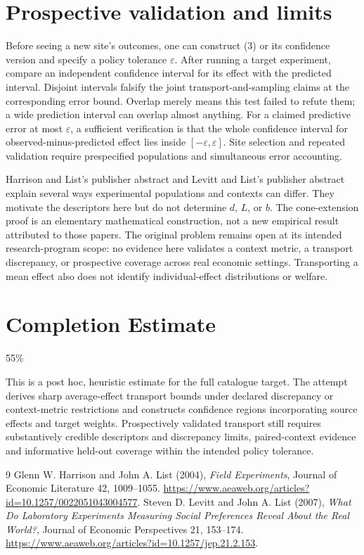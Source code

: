 \documentclass[11pt]{article}
\begin{document}
\section{Prospective validation and limits}
Before seeing a new site's outcomes, one can construct (3) or its
confidence version and specify a policy tolerance $\varepsilon$.
After running a target experiment, compare an independent confidence
interval for its effect with the predicted interval. Disjoint intervals
falsify the joint transport-and-sampling claims at the corresponding
error bound. Overlap merely means this test failed to refute them; a wide
prediction interval can overlap almost anything. For a claimed predictive
error at most $\varepsilon$, a sufficient verification is that the whole
confidence interval for observed-minus-predicted effect lies inside
$[-\varepsilon,\varepsilon]$. Site selection and repeated validation
require prespecified populations and simultaneous error accounting.

Harrison and List's publisher abstract and Levitt and List's publisher
abstract explain several ways experimental populations and contexts can
differ. They motivate the descriptors here but do not determine $d$, $L$,
or $b$. The cone-extension proof is an elementary mathematical
construction, not a new empirical result attributed to those papers.
The original problem remains open at its intended research-program scope:
no evidence here validates a context metric, a transport discrepancy, or
prospective coverage across real economic settings. Transporting a mean
effect also does not identify individual-effect distributions or welfare.

\section{Completion Estimate}
55\%

This is a post hoc, heuristic estimate for the full catalogue target.
The attempt derives sharp average-effect transport bounds under declared discrepancy or context-metric restrictions and constructs confidence regions incorporating source effects and target weights. Prospectively validated transport still requires substantively credible descriptors and discrepancy limits, paired-context evidence and informative held-out coverage within the intended policy tolerance.

\begin{thebibliography}{9}
 Glenn W. Harrison and John A. List (2004),
\emph{Field Experiments}, Journal of Economic Literature 42, 1009--1055.
\url{https://www.aeaweb.org/articles?id=10.1257/0022051043004577}.
 Steven D. Levitt and John A. List (2007),
\emph{What Do Laboratory Experiments Measuring Social Preferences Reveal
About the Real World?}, Journal of Economic Perspectives 21, 153--174.
\url{https://www.aeaweb.org/articles?id=10.1257/jep.21.2.153}.
\end{thebibliography}
\end{document}
